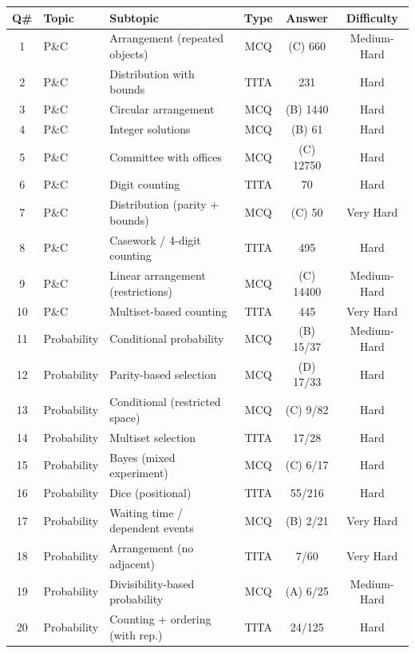 \documentclass[11pt]{article}
\begin{document}
\begin{longtable}{|c|l|l|c|c|c|}
\hline
\textbf{Q\#} & \textbf{Topic} & \textbf{Subtopic} & \textbf{Type} & \textbf{Answer} & \textbf{Difficulty} \\
\hline
1 & P\&C & Arrangement (repeated objects) & MCQ & (C) 660 & Medium-Hard \\
\hline
2 & P\&C & Distribution with bounds & TITA & 231 & Hard \\
\hline
3 & P\&C & Circular arrangement & MCQ & (B) 1440 & Hard \\
\hline
4 & P\&C & Integer solutions & MCQ & (B) 61 & Hard \\
\hline
5 & P\&C & Committee with offices & MCQ & (C) 12750 & Hard \\
\hline
6 & P\&C & Digit counting & TITA & 70 & Hard \\
\hline
7 & P\&C & Distribution (parity + bounds) & MCQ & (C) 50 & Very Hard \\
\hline
8 & P\&C & Casework / 4-digit counting & TITA & 495 & Hard \\
\hline
9 & P\&C & Linear arrangement (restrictions) & MCQ & (C) 14400 & Medium-Hard \\
\hline
10 & P\&C & Multiset-based counting & TITA & 445 & Very Hard \\
\hline
11 & Probability & Conditional probability & MCQ & (B) 15/37 & Medium-Hard \\
\hline
12 & Probability & Parity-based selection & MCQ & (D) 17/33 & Hard \\
\hline
13 & Probability & Conditional (restricted space) & MCQ & (C) 9/82 & Hard \\
\hline
14 & Probability & Multiset selection & TITA & 17/28 & Hard \\
\hline
15 & Probability & Bayes (mixed experiment) & MCQ & (C) 6/17 & Hard \\
\hline
16 & Probability & Dice (positional) & TITA & 55/216 & Hard \\
\hline
17 & Probability & Waiting time / dependent events & MCQ & (B) 2/21 & Very Hard \\
\hline
18 & Probability & Arrangement (no adjacent) & TITA & 7/60 & Very Hard \\
\hline
19 & Probability & Divisibility-based probability & MCQ & (A) 6/25 & Medium-Hard \\
\hline
20 & Probability & Counting + ordering (with rep.) & TITA & 24/125 & Hard \\
\hline
\end{longtable}
\end{document}
